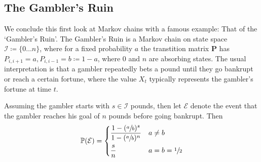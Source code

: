 	\subsection{The Gambler's Ruin}
		We conclude this first look at Markov chains with a famous example: That of the `Gambler's 
		Ruin'. The Gambler's Ruin is a Markov chain on state space $\mathcal{I} \coloneqq\{0 \hdots 
		n\}$, where for a fixed probability
		$a$ the transtition matrix $\mathbf{P}$ has $P_{i, i+1} = a, P_{i, i-1} = b \coloneqq 1-a$, 
		where $0$ and $n$ are absorbing states. The usual interpretation is that a gambler repeatedly 
		bets a pound until they go bankrupt or reach a certain fortune, where the value $X_t$ typically
		represents the gambler's fortune at time $t$. \par

		\begin{lemma}
			\label{lemma:grprsucc}
			Assuming the gambler starts with $s \in \mathcal{I}$ pounds, then let $\mathcal{E}$ 
			denote the event that the gambler reaches his goal of $n$ pounds before going bankrupt.
			Then
			$$
				\mathbb{P}(\mathcal{E}) = 
				\begin{dcases}
					\frac{1-(\sfrac{a}{b})^s}{1-(\sfrac{a}{b})^n} & a \neq b \\
					\frac{s}{n} & a = b = \sfrac{1}{2} 
				\end{dcases}
			$$
		\end{lemma}
